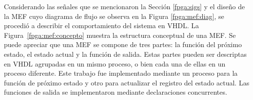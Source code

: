 Considerando las señales que se mencionaron la Sección \ref{fpga:sigs} y el diseño de la MEF cuyo diagrama de flujo se observa en la Figura \ref{fpga:mef:diag}, se procedió a describir el comportamiento del sistema en VHDL. La Figura~\ref{fpga:mef:concepto} muestra la estructura conceptual de una MEF. Se puede apreciar que una MEF se compone de tres partes: la función del próximo estado, el estado actual y la función de salida. Estas partes pueden ser descriptas en VHDL agrupadas en un mismo proceso, o bien cada una de ellas en un proceso diferente. Este trabajo fue implementado mediante un proceso para la función de próximo estado y otro para actualizar el registro del estado actual. Las funciones de salida se implementaron mediante declaraciones concurrentes.

%
%

